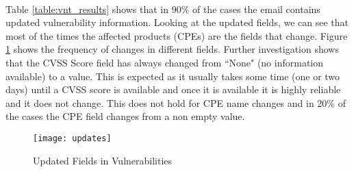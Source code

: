 \paragraph{}
Table \ref{table:vnt_results} shows that in 90\%  of the cases the email contains updated vulnerability information. Looking at the updated fields, we can see that most of the times the affected products (CPEs) are the fields that change. Figure \ref{figure:updates} shows the frequency of changes in different fields. Further investigation shows that the CVSS Score field has always changed from ``None" (no information available) to a value. This is expected as it usually takes some time (one or two days) until a CVSS score is available and once it is available it is highly reliable and it does not change. This does not hold for CPE name changes and in 20\% of the cases the CPE field changes from a non empty value.




\begin{figure}[h!]
  \centering
    \texttt{[image: updates]}
  \caption{Updated Fields in Vulnerabilities}
  \label{figure:updates}

\end{figure}
















